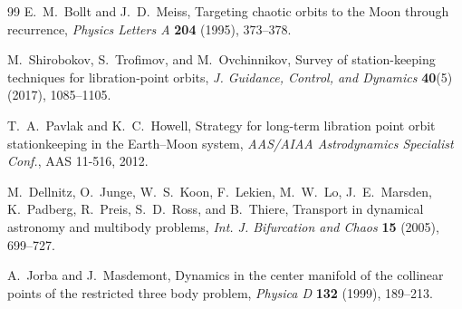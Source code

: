 \documentclass[11pt,a4paper]{article}
\begin{document}
\begin{thebibliography}{99}
E.~M.~Bollt and J.~D.~Meiss, Targeting chaotic orbits to the Moon through recurrence, \textit{Physics Letters A} \textbf{204} (1995), 373--378.

M.~Shirobokov, S.~Trofimov, and M.~Ovchinnikov, Survey of station-keeping techniques for libration-point orbits, \textit{J. Guidance, Control, and Dynamics} \textbf{40}(5) (2017), 1085--1105.

T.~A.~Pavlak and K.~C.~Howell, Strategy for long-term libration point orbit stationkeeping in the Earth--Moon system, \textit{AAS/AIAA Astrodynamics Specialist Conf.}, AAS 11-516, 2012.

M.~Dellnitz, O.~Junge, W.~S.~Koon, F.~Lekien, M.~W.~Lo, J.~E.~Marsden, K.~Padberg, R.~Preis, S.~D.~Ross, and B.~Thiere, Transport in dynamical astronomy and multibody problems, \textit{Int. J. Bifurcation and Chaos} \textbf{15} (2005), 699--727.

A.~Jorba and J.~Masdemont, Dynamics in the center manifold of the collinear points of the restricted three body problem, \textit{Physica D} \textbf{132} (1999), 189--213.

\end{thebibliography}
\end{document}
